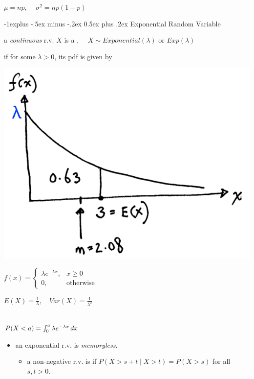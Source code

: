 \documentclass[10pt, landscape]{article}
\makeatletter
\renewcommand{\subsection}{\@startsection{subsection}{2}{0mm}%
  {-1explus -.5ex minus -.2ex}%
  {0.5ex plus .2ex}%
{\normalfont\normalsize\bfseries}}
\makeatother
\begin{document}
\begin{multicols*}{3}
\begin{tightcenter}
    $\mu = np$, $\quad \sigma^2 = np(1-p)$
  \end{tightcenter}

  \subsection{Exponential Random Variable}

  a \textit{continuous} r.v. $X$ is a , $\quad X \sim Exponential(\lambda)$ or $Exp(\lambda)$ 

  if for some $\lambda > 0$, its pdf is given by 

  \begin{minipage}[c]{0.3\linewidth}
    \includegraphics[width=0.95\linewidth]{st2131-exponential-rv-example.png} 
  \end{minipage}
  \begin{minipage}[c]{0.65\linewidth}
    \begin{tightcenter}
      $f(x) = \begin{cases} \lambda e^{-\lambda x}, &x \geq 0 \\ 0, &\text{otherwise} \end{cases}$

      $E(X) = \frac{1}{\lambda}, \quad Var(X) = \frac{1}{\lambda^2}$
      \ \\ \ 

      $P(X < a) = \int^a_0 \lambda e^{-\lambda x} \mathop{dx}$
    \end{tightcenter}
  \end{minipage}

  \begin{itemize}
    \item an exponential r.v. is \textit{memoryless}.
      \begin{itemize}
        \item a non-negative r.v. is  if $P(X > s + t \mid X > t) = P(X > s)$ for all  $s, t > 0$.
      \end{itemize}
  \end{itemize}


\end{multicols*}
\end{document}
